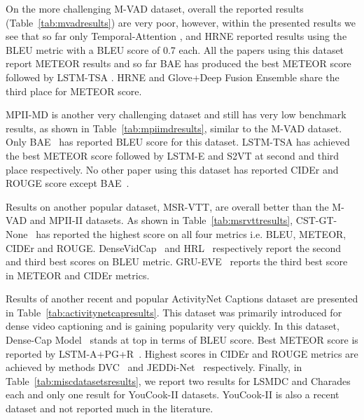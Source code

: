 \documentclass[10pt,journal,compsoc]{IEEEtran}
\begin{document}
On the more challenging M-VAD dataset, overall the reported results (Table~\ref{tab:mvadresults}) are very poor, however, within the presented results we see that so far only Temporal-Attention \cite{yao2015describing}, and HRNE \cite{pan2016hierarchical} reported results using the BLEU metric with a BLEU score of 0.7 each. All the papers using this dataset report METEOR results and so far BAE \cite{Baraldi_2017_CVPR} has produced the best METEOR score followed by LSTM-TSA \cite{Pan_2017_CVPR}. HRNE \cite{pan2016hierarchical} and Glove+Deep Fusion Ensemble \cite{venugopalan2016improving} share the third place for METEOR score.


MPII-MD is another very challenging dataset and still has very low benchmark results, as shown in Table~\ref{tab:mpiimdresults}, similar to the M-VAD dataset. Only BAE~\cite{Baraldi_2017_CVPR} has reported BLEU score for this dataset. LSTM-TSA \cite{Pan_2017_CVPR} has achieved the best METEOR score followed by LSTM-E \cite{pan2016jointly} and S2VT \cite{venugopalan2015sequence} at second and third place respectively. No other paper using this dataset has reported CIDEr and ROUGE score except BAE~\cite{Baraldi_2017_CVPR}. 

Results on another popular dataset, MSR-VTT, are overall better than the M-VAD and MPII-II datasets. As shown in Table~\ref{tab:msrvttresults}, CST-GT-None~\cite{phan2017consensus} has reported the highest score on all four metrics i.e. BLEU, METEOR, CIDEr and ROUGE. 
DenseVidCap~\cite{Shen_2017_CVPR} and HRL~\cite{wang2017video} respectively report the second and third best scores on BLEU metric. GRU-EVE~\cite{gruevehftsem} reports the third best score in METEOR and CIDEr metrics.

Results of another recent and popular ActivityNet Captions dataset are presented in Table~\ref{tab:activitynetcapresults}. This dataset was primarily introduced for dense video captioning and is gaining popularity very quickly. In this dataset, Dense-Cap Model~\cite{krishna2017dense} stands at top in terms of BLEU score. Best METEOR score is reported by LSTM-A+PG+R~\cite{yaomsr}. Highest scores in CIDEr and ROUGE metrics are achieved by methods DVC~\cite{li2018jointly} and JEDDi-Net~\cite{xu2018joint} respectively.
Finally, in Table~\ref{tab:miscdatasetsresults}, we report two results for LSMDC and Charades each and only one result for YouCook-II datasets. YouCook-II is also a recent dataset and not reported much in the literature.
\end{document}
